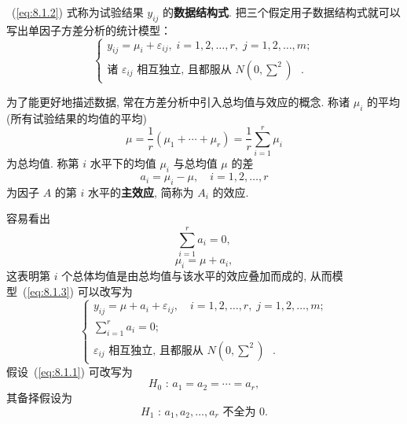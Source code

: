 ~(\ref{eq:8.1.2}) 式称为试验结果 $y_{ij}$ 的\textbf{数据结构式}. 把三个假定用子数据结构式就可以写出单因子方差分析的统计模型：
\begin{equation}
  \label{eq:8.1.3}
  \begin{cases}
    y_{ij}  = \mu_i + \varepsilon_{ij}, \; i = 1,2,\ldots,r,\; j = 1,2,\ldots,m; \\
    \text{诸 $\varepsilon_{ij}$ 相互独立, 且都服从 $N(0,\sum^2)$ }.
  \end{cases}
\end{equation}

为了能更好地描述数据, 常在方差分析中引入总均值与效应的概念. 称诸 $\mu_i$ 的平均(所有试验结果的均值的平均)
\begin{equation}
  \label{eq.8.1.4}
  \mu = \frac{1}{r} (\mu_1 + \cdots + \mu_r) = \frac{1}{r} \sum_{i=1}^{r} \mu_i
\end{equation}
为总均值. 称第 $i$ 水平下的均值 $\mu_i$ 与总均值 $\mu$ 的差
\begin{equation}
  \label{eq:8.1.5}
  a_i = \mu_i - \mu, \quad i = 1,2,\ldots,r
\end{equation}
为因子 $A$ 的第 $i$ 水平的\textbf{主效应}, 简称为 $A_i$ 的效应. 

容易看出 
\begin{equation}
  \label{eq:8.1.6}
  \sum_{i=1}^{r} a_i = 0,
\end{equation}
\begin{equation}
  \label{eq:8.1.7}
  \mu_i = \mu + a_i,
\end{equation}
这表明第 $i$ 个总体均值是由总均值与该水平的效应叠加而成的, 从而模型~(\ref{eq:8.1.3}) 可以改写为
\begin{equation}
  \label{eq:8.1.8}
  \begin{cases}
    y_{ij}  = \mu + a_i + \varepsilon_{ij}, \quad i = 1,2,\ldots,r,\; j = 1,2,\ldots,m; \\
    \sum\limits_{i=1}^{r} a_i = 0; \\
    \text{$\varepsilon_{ij}$ 相互独立, 且都服从 $N(0,\sum^2)$ }.
  \end{cases}
\end{equation}
假设~(\ref{eq:8.1.1}) 可改写为 
\begin{equation}
  H_0 \textrm{ : } a_1 = a_2 = \cdots = a_r,\label{eq:8.1.9}
\end{equation}
其备择假设为
\begin{equation*}
  H_1 \text{ : } a_1,a_2,\ldots,a_r \text{ 不全为 0.}
\end{equation*}

